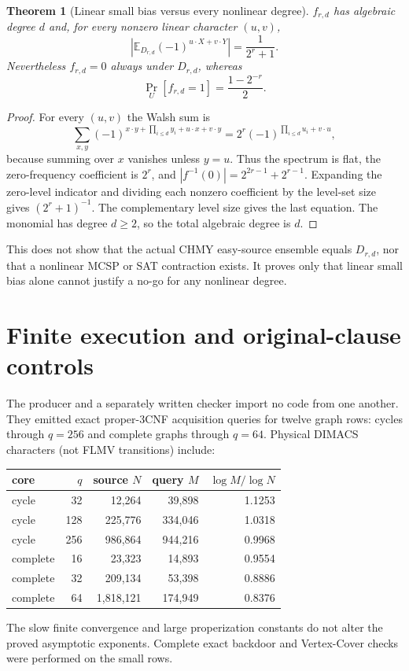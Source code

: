 \documentclass[11pt]{article}
\newtheorem{theorem}{Theorem}
\begin{document}
\begin{theorem}[Linear small bias versus every nonlinear degree]
$f_{r,d}$ has algebraic degree $d$ and, for every nonzero linear character
$(u,v)$,
\[
 \left|\mathbb E_{D_{r,d}}(-1)^{u\cdot X+v\cdot Y}\right|
 =\frac{1}{2^r+1}.
\]
Nevertheless $f_{r,d}=0$ always under $D_{r,d}$, whereas
\[
 \Pr_U[f_{r,d}=1]=\frac{1-2^{-r}}{2}.
\]
\end{theorem}
\begin{proof}
For every $(u,v)$ the Walsh sum is
\[
 \sum_{x,y}(-1)^{x\cdot y+\prod_{i\le d}y_i+u\cdot x+v\cdot y}
 =2^r(-1)^{\prod_{i\le d}u_i+v\cdot u},
\]
because summing over $x$ vanishes unless $y=u$.  Thus the spectrum is flat,
the zero-frequency coefficient is $2^r$, and
$|f^{-1}(0)|=2^{2r-1}+2^{r-1}$.  Expanding the zero-level indicator and dividing
each nonzero coefficient by the level-set size gives $(2^r+1)^{-1}$.
The complementary level size gives the last equation.  The monomial has degree
$d\ge2$, so the total algebraic degree is $d$.
\end{proof}

This does not show that the actual CHMY easy-source ensemble equals
$D_{r,d}$, nor that a nonlinear MCSP or SAT contraction exists.  It proves only
that linear small bias alone cannot justify a no-go for any nonlinear degree.

\section{Finite execution and original-clause controls}
The producer and a separately written checker import no code from one another.
They emitted exact proper-3CNF acquisition queries for twelve graph rows:
cycles through $q=256$ and complete graphs through $q=64$.  Physical DIMACS
characters (not FLMV transitions) include:
\begin{center}\small
\begin{tabular}{lrrrr}\toprule
core & $q$ & source $N$ & query $M$ & $\log M/\log N$\\\midrule
cycle&32&12,264&39,898&1.1253\\
cycle&128&225,776&334,046&1.0318\\
cycle&256&986,864&944,216&0.9968\\
complete&16&23,323&14,893&0.9554\\
complete&32&209,134&53,398&0.8886\\
complete&64&1,818,121&174,949&0.8376\\\bottomrule
\end{tabular}
\end{center}
The slow finite convergence and large properization constants do not alter the
proved asymptotic exponents.  Complete exact backdoor and Vertex-Cover checks
were performed on the small rows.
\end{document}
